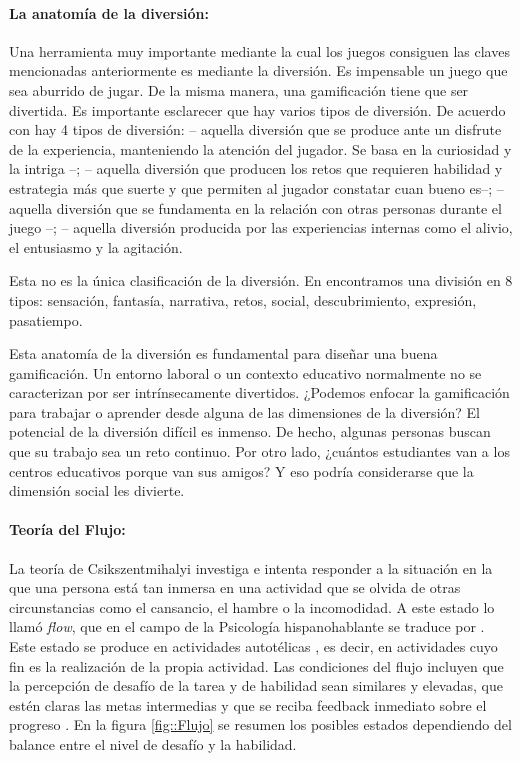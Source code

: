 \paragraph{La anatomía de la diversión: }

Una herramienta muy importante mediante la cual los juegos consiguen las claves mencionadas anteriormente es mediante la diversión.
%
Es impensable un juego que sea aburrido de jugar.
%
De la misma manera, una gamificación tiene que ser divertida.
%
Es importante esclarecer que hay varios tipos de diversión.
%
De acuerdo con  \cite{whyweplaygames} hay 4 tipos de diversión: 
%
 -- aquella diversión que se produce ante un disfrute de la experiencia, manteniendo la atención del jugador. Se basa en la curiosidad y la intriga --;
%
\label{kindsoffun}
  -- aquella diversión que producen los retos que requieren habilidad y estrategia más que suerte y que permiten al jugador constatar cuan bueno es--;
%
 -- aquella diversión que se fundamenta en la relación con otras personas durante el juego --;
%
 -- aquella diversión producida por las experiencias internas como el alivio, el entusiasmo y la agitación.

Esta no es la única clasificación de la diversión.
%
En  \cite{MDA} encontramos una división en 8 tipos: sensación, fantasía, narrativa, retos, social, descubrimiento, expresión, pasatiempo.
%
\label{AnatomyOfFun}
%

Esta anatomía de la diversión es fundamental para diseñar una buena gamificación.
%
Un entorno laboral o un contexto educativo normalmente no se caracterizan por ser intrínsecamente divertidos.
%
¿Podemos enfocar la gamificación para trabajar o aprender desde alguna de las dimensiones de la diversión? 
%
El potencial de la diversión difícil es inmenso. 
%
De hecho, algunas personas buscan que su trabajo sea un reto continuo.
%
Por otro lado, ¿cuántos estudiantes van a los centros educativos porque van sus amigos?
%
Y eso podría considerarse que la dimensión social les divierte.


\paragraph{Teoría del Flujo:} La teoría de Csikszentmihalyi investiga e intenta responder a la situación en la que una persona está tan inmersa en una actividad que se olvida de otras circunstancias como el cansancio, el hambre o la incomodidad.
%
A este estado lo llamó \textit{flow}, que en el campo de la Psicología hispanohablante se traduce por .
%
Este estado se produce en actividades autotélicas \label{autotel}, es decir, en actividades cuyo fin es la realización de la propia actividad.
%
Las condiciones del flujo incluyen que la percepción de desafío de la tarea y de habilidad sean similares y elevadas, que estén claras las metas intermedias y que se reciba feedback inmediato sobre el progreso \cite{Flow}.
%
En la figura \ref{fig::Flujo} se resumen los posibles estados dependiendo del balance entre el nivel de desafío y la habilidad.

